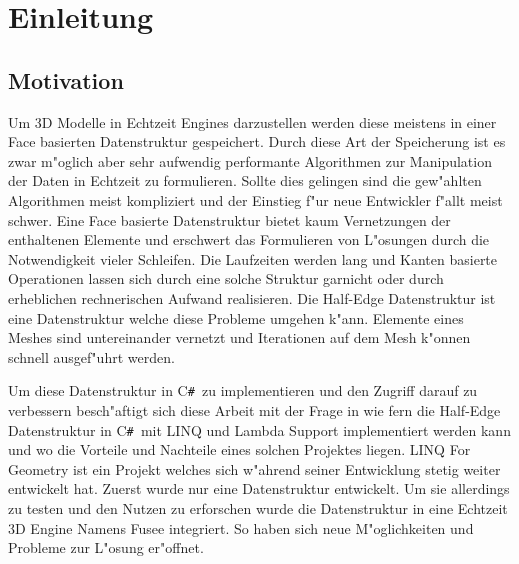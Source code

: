 \documentclass[pagesize, paper=a4, fontsize=12pt,titlepage=true, headings=small, headnosepline, abstractoff, liststotoc, nochapterprefix, plainheadsepline]{scrreprt}
\newcommand{\CSS}{C\texttt{\# }}
\newcommand{\LFGS}{LINQ For Geometry }
\newcommand{\HES}{Half-Edge Datenstruktur }
\begin{document}
\begingroup
	\clearpage
	\pagestyle{empty}
	\renewcommand*{\chapterpagestyle}{empty}
	\tableofcontents
	\clearpage
\endgroup

\pagestyle{plain}
\setcounter{page}{1}









\chapter {Einleitung}
	\section {Motivation}
Um 3D Modelle in Echtzeit Engines darzustellen werden diese meistens in einer Face basierten Datenstruktur gespeichert. Durch diese Art der Speicherung ist es zwar m"oglich aber sehr aufwendig performante Algorithmen zur Manipulation der Daten in Echtzeit zu formulieren. Sollte dies gelingen sind die gew"ahlten Algorithmen meist kompliziert und der Einstieg f"ur neue Entwickler f"allt meist schwer. Eine Face basierte Datenstruktur bietet kaum Vernetzungen der enthaltenen Elemente und erschwert das Formulieren von L"osungen durch die Notwendigkeit vieler Schleifen. Die Laufzeiten werden lang und Kanten basierte Operationen lassen sich durch eine solche Struktur garnicht oder durch erheblichen rechnerischen Aufwand realisieren. Die \HES ist eine Datenstruktur welche diese Probleme umgehen k"ann. Elemente eines Meshes sind untereinander vernetzt und Iterationen auf dem Mesh k"onnen schnell ausgef"uhrt werden.
\newline

Um diese Datenstruktur in \CSS zu implementieren und den Zugriff darauf zu verbessern besch"aftigt sich diese Arbeit mit der Frage in wie fern die \HES in \CSS mit LINQ und Lambda Support implementiert werden kann und wo die Vorteile und Nachteile eines solchen Projektes liegen. \LFGS ist ein Projekt welches sich w"ahrend seiner Entwicklung stetig weiter entwickelt hat. Zuerst wurde nur eine Datenstruktur entwickelt. Um sie allerdings zu testen und den Nutzen zu erforschen wurde die Datenstruktur in eine Echtzeit 3D Engine Namens Fusee integriert. So haben sich neue M"oglichkeiten und Probleme zur L"osung er"offnet.
\newline
\end{document}
